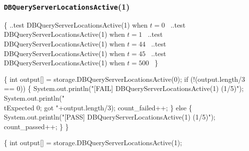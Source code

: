 \documentclass{article}
\def\nwendcode{\endtrivlist \endgroup}
\let\nwdocspar=\par
\begin{document}
\subsubsection{{\tt{}DBQueryServerLocationsActive}(1)}
\nwenddocs{}\endmoddef{}
\{
  \LA{}..test \code{}DBQueryServerLocationsActive\edoc{}(1) when $t=0$~{\nwtagstyle{}}\RA{}
  \LA{}..test \code{}DBQueryServerLocationsActive\edoc{}(1) when $t=1$~{\nwtagstyle{}}\RA{}
  \LA{}..test \code{}DBQueryServerLocationsActive\edoc{}(1) when $t=44$~{\nwtagstyle{}}\RA{}
  \LA{}..test \code{}DBQueryServerLocationsActive\edoc{}(1) when $t=45$~{\nwtagstyle{}}\RA{}
  \LA{}..test \code{}DBQueryServerLocationsActive\edoc{}(1) when $t=500$~{\nwtagstyle{}}\RA{}
\}
\nwendcode{}\nwdocspar
\nwenddocs{}\endmoddef{}
\{
  int output[] = storage.DBQueryServerLocationsActive(0);
  if (!(output.length/3 == 0)) \{
    System.out.println("[FAIL] DBQueryServerLocationsActive(1) (1/5)");
    System.out.println("\\tExpected 0; got "+output.length/3);
    count_failed++;
  \} else \{
    System.out.println("[PASS] DBQueryServerLocationsActive(1) (1/5)");
    count_passed++;
  \}
\}
\nwendcode{}\nwdocspar
\nwenddocs{}\endmoddef{}
\{
  int output[] = storage.DBQueryServerLocationsActive(1);
\end{document}
